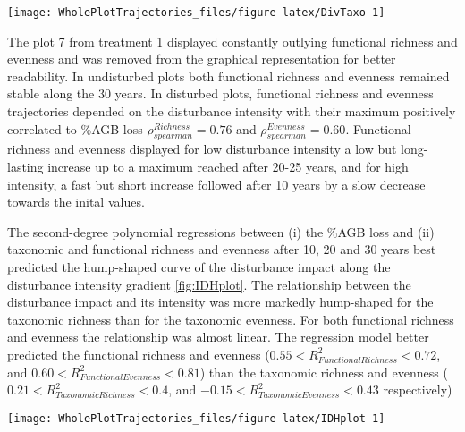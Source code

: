 \documentclass[fleqn,10pt]{ArtEcoFoG} %
\begin{document}
\begin{figure*}

{\centering \texttt{[image: WholePlotTrajectories\_files/figure-latex/DivTaxo-1]} 

}

\caption{Trajectories over 30 years of the difference with the 1989 inventory (2 years after disturbance) of community taxonomic \textbf{(a)} richness, \textbf{(b)}, taxonomic evenness, \textbf{(c)} functional richness, and \textbf{(d)} functional evenness. Colors are treatments: green (control), blue (T1), orange (T2), red (T3) with shaded areas the credibility intervals }\label{fig:DivTaxo}
\end{figure*}

The plot 7 from treatment 1 displayed constantly outlying functional
richness and evenness and was removed from the graphical representation
for better readability. In undisturbed plots both functional richness
and evenness remained stable along the 30 years. In disturbed plots,
functional richness and evenness trajectories depended on the
disturbance intensity with their maximum positively correlated to \%AGB
loss \(\rho_{spearman}^{Richness}=0.76\) and
\(\rho_{spearman}^{Evenness}=0.60\). Functional richness and evenness
displayed for low disturbance intensity a low but long-lasting increase
up to a maximum reached after 20-25 years, and for high intensity, a
fast but short increase followed after 10 years by a slow decrease
towards the inital values.

The second-degree polynomial regressions between (i) the \%AGB loss and
(ii) taxonomic and functional richness and evenness after 10, 20 and 30
years best predicted the hump-shaped curve of the disturbance impact
along the disturbance intensity gradient \ref{fig:IDHplot}. The
relationship between the disturbance impact and its intensity was more
markedly hump-shaped for the taxonomic richness than for the taxonomic
evenness. For both functional richness and evenness the relationship was
almost linear. The regression model better predicted the functional
richness and evenness (\(0.55<R^2_{Functional Richness}<0.72\), and
\(0.60<R^2_{Functional Evenness}<0.81\)) than the taxonomic richness and
evenness (\(0.21<R^2_{Taxonomic Richness}<0.4\), and
\(-0.15<R^2_{Taxonomic Evenness}<0.43\) respectively)

\begin{figure*}

{\centering \texttt{[image: WholePlotTrajectories\_files/figure-latex/IDHplot-1]} 

}

\caption{Relationship between the initial \%AGB loss and community taxonmic richness \textbf{(a)}, taxonomic evenness \textbf{(b)}, functional richness \textbf{(c)},and functional evenness \textbf{(d)} at 10, 20 and 30 years after disturbance. Colors are treatments: green (control), blue (T1), orange (T2), red (T3) with shaded areas the credibility intervals }\label{fig:IDHplot}
\end{figure*}
\end{document}
